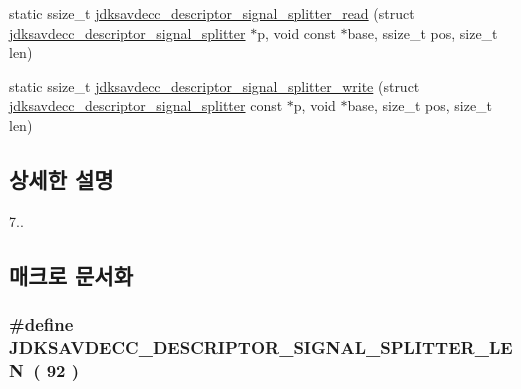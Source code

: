 \begin{DoxyCompactItemize}
static ssize\+\_\+t \hyperlink{group__descriptor__signal__splitter_ga43f29f655e003ad6e068a28339a7e66a}{jdksavdecc\+\_\+descriptor\+\_\+signal\+\_\+splitter\+\_\+read} (struct \hyperlink{structjdksavdecc__descriptor__signal__splitter}{jdksavdecc\+\_\+descriptor\+\_\+signal\+\_\+splitter} $\ast$p, void const $\ast$base, ssize\+\_\+t pos, size\+\_\+t len)
\item 
static ssize\+\_\+t \hyperlink{group__descriptor__signal__splitter_gad4d100f9c484b57f263df0f9020d625a}{jdksavdecc\+\_\+descriptor\+\_\+signal\+\_\+splitter\+\_\+write} (struct \hyperlink{structjdksavdecc__descriptor__signal__splitter}{jdksavdecc\+\_\+descriptor\+\_\+signal\+\_\+splitter} const $\ast$p, void $\ast$base, size\+\_\+t pos, size\+\_\+t len)
\end{DoxyCompactItemize}


\subsection{상세한 설명}
7.. 

\subsection{매크로 문서화}
\subsubsection[{\texorpdfstring{J\+D\+K\+S\+A\+V\+D\+E\+C\+C\+\_\+\+D\+E\+S\+C\+R\+I\+P\+T\+O\+R\+\_\+\+S\+I\+G\+N\+A\+L\+\_\+\+S\+P\+L\+I\+T\+T\+E\+R\+\_\+\+L\+EN}{JDKSAVDECC_DESCRIPTOR_SIGNAL_SPLITTER_LEN}}]{\setlength{\rightskip}{0pt plus 5cm}\#define J\+D\+K\+S\+A\+V\+D\+E\+C\+C\+\_\+\+D\+E\+S\+C\+R\+I\+P\+T\+O\+R\+\_\+\+S\+I\+G\+N\+A\+L\+\_\+\+S\+P\+L\+I\+T\+T\+E\+R\+\_\+\+L\+EN~( 92 )}\hypertarget{group__descriptor__signal__splitter_ga3afbcd74a73da7fe7c5eee3c13fad7f3}{}\label{group__descriptor__signal__splitter_ga3afbcd74a73da7fe7c5eee3c13fad7f3}


